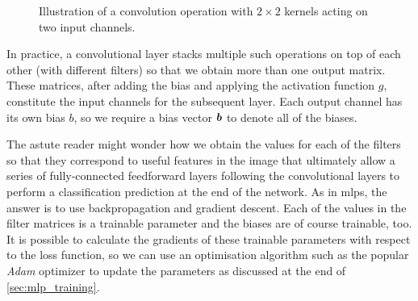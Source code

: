 \documentclass[../report.tex]{subfiles}
\begin{document}
\begin{figure}
    \caption[Illustration of a convolution operation acting on two input channels.]{Illustration of a convolution operation with $2\times 2$ kernels acting on two input channels.}
    \label{fig:conv_multiple_channels}
\end{figure}
In practice, a convolutional layer stacks multiple such operations on top of each other (with different filters) so that we obtain more than one output matrix.
These matrices, after adding the bias and applying the activation function $g$, constitute the input channels for the subsequent layer.
Each output channel has its own bias $b$, so we require a bias vector ${\bm{b}}$ to denote all of the biases.

The astute reader might wonder how we obtain the values for each of the filters so that they correspond to useful features in the image that ultimately allow a series of fully-connected feedforward layers following the convolutional layers to perform a classification prediction at the end of the network.
As in \glspl{mlp}, the answer is to use backpropagation and gradient descent.
Each of the values in the filter matrices is a trainable parameter and the biases are of course trainable, too.
It is possible to calculate the gradients of these trainable parameters with respect to the loss function, so we can use an optimisation algorithm such as the popular \emph{Adam} optimizer \cite{kingma2017} to update the parameters as discussed at the end of \cref{sec:mlp_training}.
\end{document}
